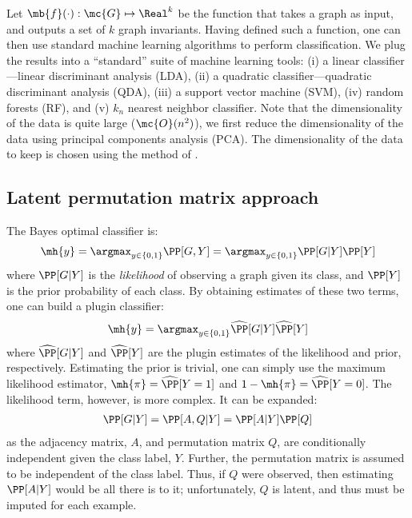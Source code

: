 Let $\mb{f}(\cdot): \mc{G} \mapsto \Real^k$ be the function that takes a graph as input, and outputs a set of $k$ graph invariants.  Having defined such a function, one can then use standard machine learning algorithms to perform classification.  We plug the results into a ``standard'' suite of machine learning tools: (i) a linear classifier---linear discriminant analysis (LDA), (ii) a quadratic classifier---quadratic discriminant analysis (QDA), (iii) a support vector machine (SVM), (iv) random forests (RF), and (v) $k_n$ nearest neighbor classifier.  Note that the dimensionality of the data is quite large ($\mc{O}(n^2)$), we first reduce the dimensionality of the data using principal components analysis (PCA).  The dimensionality of the data to keep is chosen using the method of \cite{??}.

\subsection{Latent permutation matrix approach} %
\label{sub:latent_permutation_matrix_approach}

The Bayes optimal classifier is:
\begin{align}
	\mh{y} = \argmax_{y \in \{0,1\}} \PP[G,Y] = \argmax_{y \in \{0,1\}} \PP[G | Y] \PP[Y]
\end{align}
where $\PP[G|Y]$ is the \emph{likelihood} of observing a graph given its class, and $\PP[Y]$ is the prior probability of each class.  By obtaining estimates of these two terms, one can build a plugin classifier:
\begin{align}
	\mh{y} = \argmax_{y \in \{0,1\}} \mhP[G | Y] \mhP[Y]	
\end{align}
where $\mhP[G|Y]$ and $\mhP[Y]$ are the plugin estimates of the likelihood and prior, respectively.  Estimating the prior is trivial, one can simply use the maximum likelihood estimator, $\mh{\pi}=\mhP[Y=1]$ and $1-\mh{\pi}=\mhP[Y=0]$.  The likelihood term, however, is more complex.  It can be expanded:
\begin{align}
	\PP[G|Y] = \PP[A,Q | Y] = \PP[A | Y] \PP[Q]
\end{align}
as the adjacency matrix, $A$, and permutation matrix $Q$, are conditionally independent given the class label, $Y$.  Further, the permutation matrix is assumed to be independent of the class label.  Thus, if $Q$ were observed, then estimating $\PP[A|Y]$ would be all there is to it; unfortunately, $Q$ is latent, and thus must be imputed for each example.  

